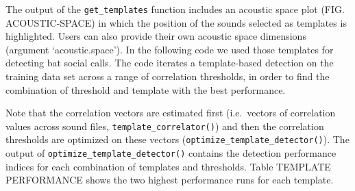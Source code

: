 \documentclass[
]{article}
\newenvironment{Shaded}{\begin{snugshade}}{\end{snugshade}}
\newcommand{\AttributeTok}[1]{\textcolor[rgb]{0.77,0.63,0.00}{#1}}
\newcommand{\CommentTok}[1]{\textcolor[rgb]{0.56,0.35,0.01}{\textit{#1}}}
\newcommand{\DecValTok}[1]{\textcolor[rgb]{0.00,0.00,0.81}{#1}}
\newcommand{\FloatTok}[1]{\textcolor[rgb]{0.00,0.00,0.81}{#1}}
\newcommand{\FunctionTok}[1]{\textcolor[rgb]{0.00,0.00,0.00}{#1}}
\newcommand{\NormalTok}[1]{#1}
\newcommand{\OtherTok}[1]{\textcolor[rgb]{0.56,0.35,0.01}{#1}}
\newcommand{\SpecialCharTok}[1]{\textcolor[rgb]{0.00,0.00,0.00}{#1}}
\begin{document}
The output of the \texttt{get\_templates} function includes an acoustic
space plot (FIG. ACOUSTIC-SPACE) in which the position of the sounds
selected as templates is highlighted. Users can also provide their own
acoustic space dimensions (argument `acoustic.space'). In the following
code we used those templates for detecting bat social calls. The code
iterates a template-based detection on the training data set across a
range of correlation thresholds, in order to find the combination of
threshold and template with the best performance.

\begin{Shaded}
\end{Shaded}

Note that the correlation vectors are estimated first (i.e.~vectors of
correlation values across sound files, \texttt{template\_correlator()})
and then the correlation thresholds are optimized on these vectors
(\texttt{optimize\_template\_detector()}). The output of
\texttt{optimize\_template\_detector()} contains the detection
performance indices for each combination of templates and thresholds.
Table TEMPLATE PERFORMANCE shows the two highest performance runs for
each template.
\end{document}
